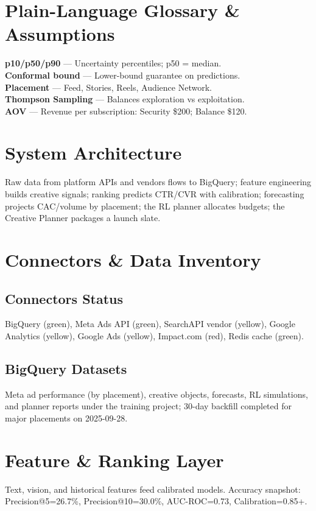 \documentclass[11pt,a4paper]{report}
\begin{document}
\chapter{Plain-Language Glossary \& Assumptions}
\begin{glossarybox}
\textbf{p10/p50/p90} --- Uncertainty percentiles; p50 = median.\\
\textbf{Conformal bound} --- Lower-bound guarantee on predictions.\\
\textbf{Placement} --- Feed, Stories, Reels, Audience Network.\\
\textbf{Thompson Sampling} --- Balances exploration vs exploitation.\\
\textbf{AOV} --- Revenue per subscription: Security \$200; Balance \$120.
\end{glossarybox}

\chapter{System Architecture}
Raw data from platform APIs and vendors flows to BigQuery; feature engineering builds creative signals; ranking predicts CTR/CVR with calibration; forecasting projects CAC/volume by placement; the RL planner allocates budgets; the Creative Planner packages a launch slate.


\chapter{Connectors \& Data Inventory}
\section{Connectors Status}
BigQuery (green), Meta Ads API (green), SearchAPI vendor (yellow), Google Analytics (yellow), Google Ads (yellow), Impact.com (red), Redis cache (green).

\section{BigQuery Datasets}
Meta ad performance (by placement), creative objects, forecasts, RL simulations, and planner reports under the training project; 30-day backfill completed for major placements on 2025-09-28.

\chapter{Feature \& Ranking Layer}
Text, vision, and historical features feed calibrated models. Accuracy snapshot: Precision@5=26.7\%, Precision@10=30.0\%, AUC-ROC=0.73, Calibration=0.85+.
\end{document}
